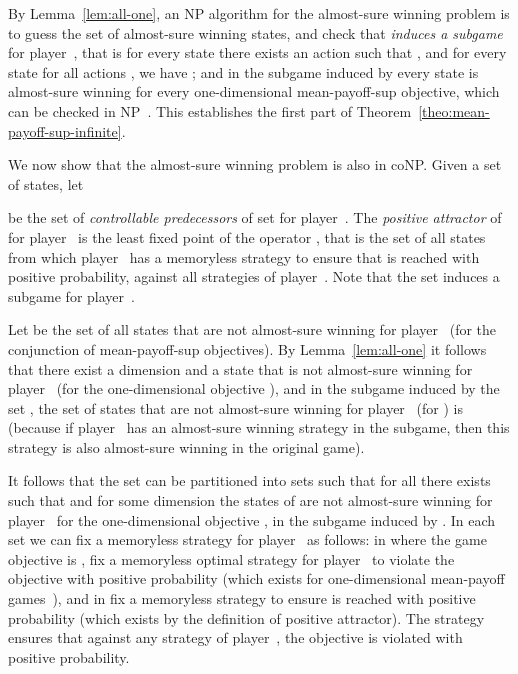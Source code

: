 \documentclass{article}
\begin{document}
\smallskip{}
By Lemma~\ref{lem:all-one}, an NP algorithm for the almost-sure winning
problem is to guess the set  of almost-sure winning states, and check
that   \emph{induces a subgame} for player~, that is for every
state  there exists an action  such that
, and for every state  
for all actions , we have ;
and  in the subgame induced by  every state is almost-sure winning
for every one-dimensional mean-payoff-sup objective, which can be checked in NP~\cite{LigLip69}.
This establishes the first part of Theorem~\ref{theo:mean-payoff-sup-infinite}.



\smallskip{}
We now show that the almost-sure winning problem is also in coNP. 
Given a set  of states, let 
 

be the set of \emph{controllable predecessors} of set  for player~.
The \emph{positive attractor}  of  for player~ is the least 
fixed point of the operator ,
that is the
set of all states from which player~ has a memoryless strategy to ensure that  is reached
with positive probability, against all strategies of player~.
Note that the set  induces a subgame for player~.



Let  be the set of all states 
that are not almost-sure winning for player~ (for the conjunction
 of mean-payoff-sup objectives). 
By Lemma~\ref{lem:all-one} it follows that  there exist a dimension  and 
a state  that is not almost-sure winning for player~ 
(for the one-dimensional objective ), and  in the subgame induced by the set 
, the set of states that are not almost-sure winning 
for player~ (for ) is 
(because if player~ has an almost-sure winning strategy in the subgame, 
then this strategy is also almost-sure winning in the original game).

It follows that the set  can be partitioned into sets 
such that for all  there exists  such that 
 and for some dimension  
the states of  are not almost-sure winning for player~ for the one-dimensional objective ,
in the subgame induced by .
In each set  we can fix a memoryless strategy  for player~ as follows:
in  where the game objective is , fix a memoryless optimal 
strategy for player~ to violate the objective  with positive probability 
(which exists for one-dimensional mean-payoff games~\cite{LigLip69}), 
and in  fix a memoryless strategy to ensure  is reached with 
positive probability (which exists by the definition of positive attractor).
The strategy  ensures that against any strategy of player~, the
objective  is violated with positive probability. 
\end{document}
